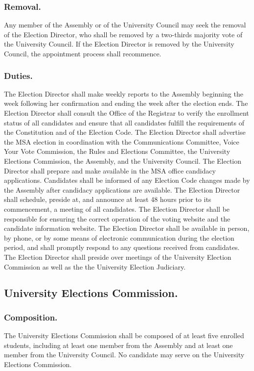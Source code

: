 \subsubsection{Removal.}
Any member of the Assembly or of the University Council may seek the removal of the Election Director, who shall be removed by a two-thirds majority vote of the University Council.  If the Election Director is removed by the University Council, the appointment process shall recommence.
\subsubsection{Duties.}
\subsubsubsection{}
The Election Director shall make weekly reports to the Assembly beginning the week following her confirmation and ending the week after the election ends.
\subsubsubsection{}
The Election Director shall consult the Office of the Registrar to verify the enrollment status of all candidates and ensure that all candidates fulfill the requirements of the Constitution and of the Election Code.
\subsubsubsection{}
The Election Director shall advertise the MSA election in coordination with the Communications Committee, Voice Your Vote Commission, the Rules and Elections Committee, the University Elections Commission, the Assembly, and the University Council.
\subsubsubsection{}
The Election Director shall prepare and make available in the MSA office candidacy applications.
\subsubsubsection{}
Candidates shall be informed of any Election Code changes made by the Assembly after candidacy applications are available.
\subsubsubsection{}
The Election Director shall schedule, preside at, and announce at least 48 hours prior to its commencement, a meeting of all candidates. 
\subsubsubsection{}
The Election Director shall be responsible for ensuring the correct operation of the voting website and the candidate information website.
\subsubsubsection{}
The Election Director shall be available in person, by phone, or by some means of electronic communication during the election period, and shall promptly respond to any questions received from candidates.
\subsubsubsection{}
The Election Director shall preside over meetings of the University Election Commission as well as the the University Election Judiciary.

\subsection{University Elections Commission.}

\subsubsection{Composition.}
The University Elections Commission shall be composed of at least five enrolled students, including at least one member from the Assembly and at least one member from the University Council.  No candidate may serve on the University Elections Commission. 

